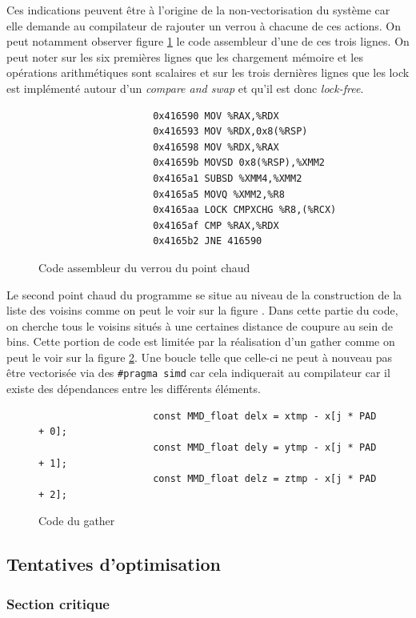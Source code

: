 \documentclass[11pt,a4paper]{article}
\begin{document}
			Ces indications peuvent être à l'origine de la non-vectorisation du système car elle demande au compilateur de rajouter un verrou à chacune de ces actions. On peut notamment observer figure \ref{code:hotspot_lock} le code assembleur d'une de ces trois lignes. On peut noter sur les six premières lignes que les chargement mémoire et les opérations arithmétiques sont scalaires et sur les trois dernières lignes que les lock est implémenté autour d'un \textit{compare and swap} et qu'il est donc \textit{lock-free}.

			\begin{figure}[h!]
				\centering
				\begin{verbatim}
					0x416590 MOV %RAX,%RDX
					0x416593 MOV %RDX,0x8(%RSP)
					0x416598 MOV %RDX,%RAX
					0x41659b MOVSD 0x8(%RSP),%XMM2
					0x4165a1 SUBSD %XMM4,%XMM2
					0x4165a5 MOVQ %XMM2,%R8
					0x4165aa LOCK CMPXCHG %R8,(%RCX)
					0x4165af CMP %RAX,%RDX
					0x4165b2 JNE 416590
				\end{verbatim}
				\caption{Code assembleur du verrou du point chaud}
				\label{code:hotspot_lock}
			\end{figure}

			Le second point chaud du programme se situe au niveau de la construction de la liste des voisins comme on peut le voir sur la figure \label{loop_maqao}. Dans cette partie du code, on cherche tous le voisins situés à une certaines distance de coupure au sein de bins. Cette portion de code est limitée par la réalisation d'un gather comme on peut le voir sur la figure \ref{code:hotspot_gather}. Une boucle telle que celle-ci ne peut à nouveau pas être vectorisée via des \verb!#pragma simd! car cela indiquerait au compilateur car il existe des dépendances entre les différents éléments.

			\begin{figure}[h!]
				\centering
				\begin{verbatim}
					const MMD_float delx = xtmp - x[j * PAD + 0];
					const MMD_float dely = ytmp - x[j * PAD + 1];
					const MMD_float delz = ztmp - x[j * PAD + 2];
	            \end{verbatim}
            	\caption{Code du gather}
				\label{code:hotspot_gather}
	        \end{figure}
		\subsection{Tentatives d'optimisation}
			\subsubsection{Section critique}
\end{document}

